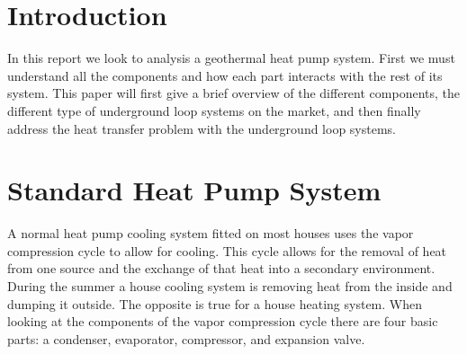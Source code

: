 \section{Introduction}
In this report we look to analysis a geothermal heat pump system. First we must understand all the components and how each part interacts with the rest of its system. This paper will first give a brief overview of the different components, the different type of underground loop systems on the market, and then finally address the heat transfer problem with the underground loop systems.
%
\section{Standard Heat Pump System}
A normal heat pump cooling system fitted on most houses uses the vapor compression cycle to allow for cooling. This cycle allows for the removal of heat from one source and the exchange of that heat into a secondary environment. During the summer a house cooling system is removing heat from the inside and dumping it outside. The opposite is true for a house heating system. When looking at the components of the vapor compression cycle there are four basic parts: a condenser, evaporator, compressor, and expansion valve.
%
\begin{figure}[!tbph]
  \centering
  \hfill
\end{figure}
